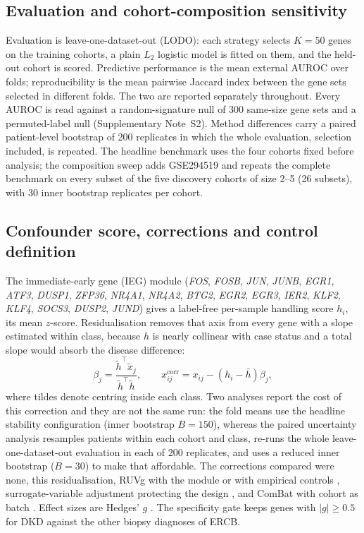 \documentclass[unnumsec,webpdf,contemporary,large,numbered]{oup-authoring-template}
\begin{document}
\subsection{Evaluation and cohort-composition sensitivity}\label{sec:nulls}

Evaluation is leave-one-dataset-out (LODO): each strategy selects $K = 50$ genes on the training
cohorts, a plain $L_2$ logistic model is fitted on them, and the held-out cohort is scored.
Predictive performance is the mean external AUROC over folds; reproducibility is the mean pairwise
Jaccard index between the gene sets selected in different folds. The two are reported separately
throughout. Every AUROC is read against a random-signature null of 300 same-size gene sets and a
permuted-label null (Supplementary Note~S2). Method differences carry a paired patient-level
bootstrap of 200 replicates in which the whole evaluation, selection included, is repeated. The
headline benchmark uses the four cohorts fixed before analysis; the composition sweep adds
GSE294519 and repeats the complete benchmark on every subset of the five discovery cohorts of
size 2--5 (26 subsets), with 30 inner bootstrap replicates per cohort.

\subsection{Confounder score, corrections and control definition}\label{sec:corrections}

The immediate-early gene (IEG) module (\textit{FOS}, \textit{FOSB}, \textit{JUN}, \textit{JUNB},
\textit{EGR1}, \textit{ATF3}, \textit{DUSP1}, \textit{ZFP36}, \textit{NR4A1}, \textit{NR4A2},
\textit{BTG2}, \textit{EGR2}, \textit{EGR3}, \textit{IER2}, \textit{KLF2}, \textit{KLF4},
\textit{SOCS3}, \textit{DUSP2}, \textit{JUND}) gives a label-free per-sample handling score $h_i$,
its mean $z$-score. Residualisation removes that axis from every gene with a slope estimated
within class, because $h$ is nearly collinear with case status and a total slope would absorb the
disease difference:
\begin{equation}
\beta_j = \frac{\tilde{h}^{\top} \tilde{x}_j}{\tilde{h}^{\top} \tilde{h}} , \qquad
x_{ij}^{\text{corr}} = x_{ij} - (h_i - \bar{h}) \beta_j ,
\label{eq:resid}
\end{equation}
where tildes denote centring inside each class. Two analyses report the cost of this correction
and they are not the same run: the fold means use the headline stability configuration (inner
bootstrap $B = 150$), whereas the paired uncertainty analysis resamples patients within each
cohort and class, re-runs the whole leave-one-dataset-out evaluation in each of 200 replicates, and
uses a reduced inner bootstrap ($B = 30$) to make that affordable. The corrections compared were none, this
residualisation, RUVg with the module or with empirical controls \cite{risso2014},
surrogate-variable adjustment protecting the design \cite{leek2007}, and ComBat with cohort as
batch \cite{johnson2007}. Effect sizes are Hedges' $g$ \cite{hedges1981}. The specificity gate
keeps genes with $|g| \ge 0.5$ for DKD against the other biopsy diagnoses of ERCB.
\end{document}
